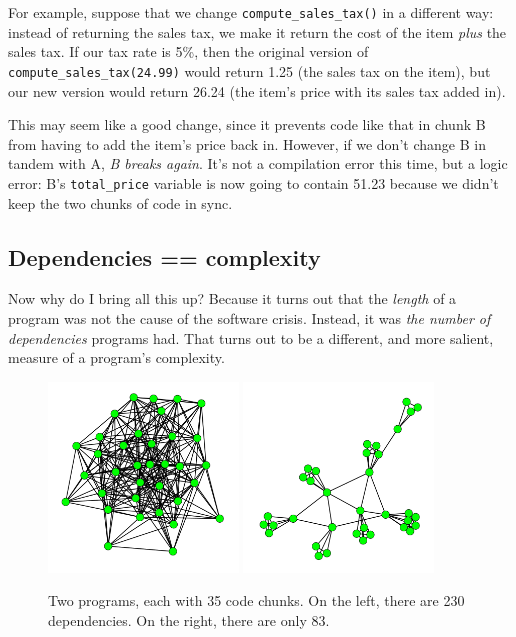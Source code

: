 For example, suppose that we change \texttt{compute\_sales\_tax()} in a
different way: instead of returning the sales tax, we make it return the cost
of the item \textit{plus} the sales tax. If our tax rate is 5\%, then the
original version of \texttt{compute\_sales\_tax(24.99)} would return 1.25 (the
sales tax on the item), but our new version would return 26.24 (the item's
price with its sales tax added in).

This may seem like a good change, since it prevents code like that in chunk B
from having to add the item's price back in. However, if we don't change B in
tandem with A, \textit{B breaks again}. It's not a compilation error this
time, but a logic error: B's \texttt{total\_price} variable is now going to
contain 51.23 because we didn't keep the two chunks of code in sync.

\subsection{Dependencies == complexity}

Now why do I bring all this up? Because it turns out that the \textit{length}
of a program was not the cause of the software crisis. Instead, it was
\textit{the number of dependencies} programs had. That turns out to be a
different, and more salient, measure of a program's complexity.

\begin{figure}[ht]
\centering
\includegraphics[width=0.45\textwidth]{highDependencies.png}
\includegraphics[width=0.45\textwidth]{lowDependencies.png}
\caption{Two programs, each with 35 code chunks. On the left, there are 230
dependencies. On the right, there are only 83.}
\label{fig:dependencies}
\end{figure}

